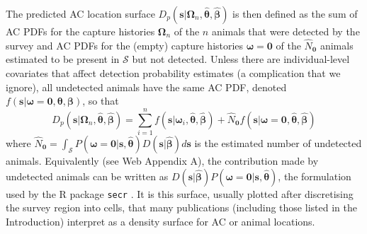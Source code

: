 \documentclass[useAMS,usenatbib,referee]{biom}
\begin{document}
The predicted AC location surface $D_p(\bm{s}|\bm{\Omega}_n,\hat{\bm{\theta}},\hat{\bm{\beta}})$ is then defined as the sum of AC PDFs for the capture histories $\bm{\Omega}_n$ of the $n$ animals that were detected by the survey and AC PDFs for the (empty) capture histories $\bm{\omega}=\bm{0}$ of the $\hat{N}_{\bm{0}}$ animals estimated to be present in $\mathcal{S}$ but not detected. Unless there are individual-level covariates that affect detection probability estimates (a complication that we ignore), all undetected animals have the same AC PDF, denoted $f(\bm{s}|\bm{\omega}=\bm{0}, \bm{\theta}, \bm{\beta})$, so that
\begin{equation} \label{eq:pls}
D_p(\bm{s}|\bm{\Omega}_n,\hat{\bm{\theta}},\hat{\bm{\beta}}) = \sum_{i=1}^n f(\bm{s}|\bm{\omega}_i, \hat{\bm{\theta}}, \hat{\bm{\beta}}) + \hat{N}_{\bm{0}} f(\bm{s}|\bm{\omega}=\bm{0}, \hat{\bm{\theta}}, \hat{\bm{\beta}})
\end{equation}
where $\hat{N}_{\bm{0}}=\int_{\mathcal{S}} P(\bm{\omega}=\bm{0}|\bm{s},\hat{\bm{\theta}})D(\bm{s}|\hat{\bm{\beta}}) d\bm{s}$ is the estimated number of undetected animals. Equivalently (see Web Appendix A), the contribution made by undetected animals can be written as $D(\bm{s}|\hat{\bm{\beta}})P(\bm{\omega}=\bm{0}|\bm{s},\hat{\bm{\theta}})$, the formulation used by the R package \texttt{secr}  \citep{secr:22}. It is this surface, usually plotted after discretising the survey region into cells, that many publications (including those listed in the Introduction) interpret as a density surface for AC or animal locations. 

\end{document}

